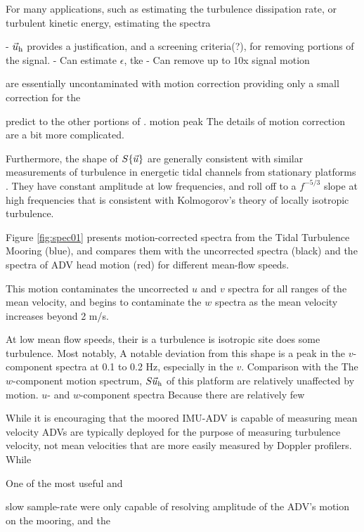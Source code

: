 \documentclass[twocol]{ametsoc}
\begin{document}
For many applications, such as estimating the turbulence dissipation rate, or turbulent kinetic energy, estimating the spectra 

- $\vec{u}_\mathrm{h}$ provides a justification, and a screening criteria(?), for removing portions of the signal.
- Can estimate $\epsilon$, tke
- Can remove up to 10x signal motion

are essentially uncontaminated with motion correction providing only a small correction for the 

predict to the other portions of . motion peak    The details of motion correction are a bit more complicated. 

Furthermore, the shape of $S\{\vec{u}\}$ are generally consistent with similar measurements of turbulence in energetic tidal channels from stationary platforms \citep[]{Thomson++2010} . They have constant amplitude at low frequencies, and roll off to a $f^{-5/3}$ slope at high frequencies that is consistent with Kolmogorov's theory of locally isotropic turbulence. 



Figure \ref{fig:spec01} presents motion-corrected spectra from the Tidal Turbulence Mooring (blue), and compares them with the uncorrected spectra (black) and the spectra of ADV head motion (red) for different mean-flow speeds.  

This motion contaminates the uncorrected $u$ and $v$ spectra for all ranges of the mean velocity, and begins to contaminate the $w$ spectra as the mean velocity increases beyond 2 m/s. 

At low mean flow speeds, their is a  turbulence is isotropic  site does some turbulence. 
Most notably, A notable deviation from this shape is a peak in the $v$-component spectra at 0.1 to 0.2 Hz, especially in the $v$. Comparison with the  The $w$-component motion spectrum, $S{\vec{u}_\mathrm{h}}$ of this platform are relatively unaffected by motion. $u$- and $w$-component spectra Because there are relatively few 

While it is encouraging that the moored IMU-ADV is capable of measuring mean velocity ADVs are typically deployed for the purpose of measuring turbulence velocity, not mean velocities that are more easily measured by Doppler profilers. While 



One of the most useful and 

slow sample-rate   were only capable of resolving  amplitude of the ADV's motion on the mooring, and the  \cite{Harding_MotionPaper}
\end{document}
